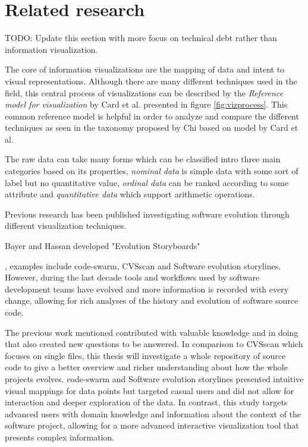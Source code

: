 

\section{Related research}

TODO: Update this section with more focus on technical debt rather than information visualization.

The core of information visualizations are the mapping of data and intent to visual representations. Although there are many different techniques used in the field, this central process of visualizations can be described by the \textit{Reference model for visualization} by Card et al. presented in figure \ref{fig:vizprocess}. \cite{card_readings_1999} 
This common reference model is helpful in order to analyze and compare the different techniques as seen in the taxonomy proposed by Chi based on model by Card et al. \cite{chi_taxonomy_2000}



The raw data can take many forms which can be classified intro three main categories based on its properties, \textit{nominal data} is simple data with some sort of label but no quantitative value, \textit{ordinal data} can be ranked according to some attribute and \textit{quantitative data} which support arithmetic operations. \cite{card_structure_1997}

Previous research has been published investigating software evolution through different visualization techniques. 


Bayer and Hassan developed "Evolution Storyboards"


, examples include code-swarm, CVSscan and Software evolution storylines. However, during the last decade tools and workflows used by software development teams have evolved and more information is recorded with every change, allowing for rich analyses of the history and evolution of software source code.

The previous work mentioned contributed with valuable knowledge and in doing that also created new questions to be answered.
In comparison to CVSscan which focuses on single files, this thesis will investigate a whole repository of source code to give a better overview and richer understanding about how the whole projects evolves.
code-swarm and Software evolution storylines presented intuitive visual mappings for data points but targeted casual users and did not allow for interaction and deeper exploration of the data.
In contrast, this study targets advanced users with domain knowledge and information about the context of the software project, allowing for a more advanced interactive visualization tool that presents complex information.
